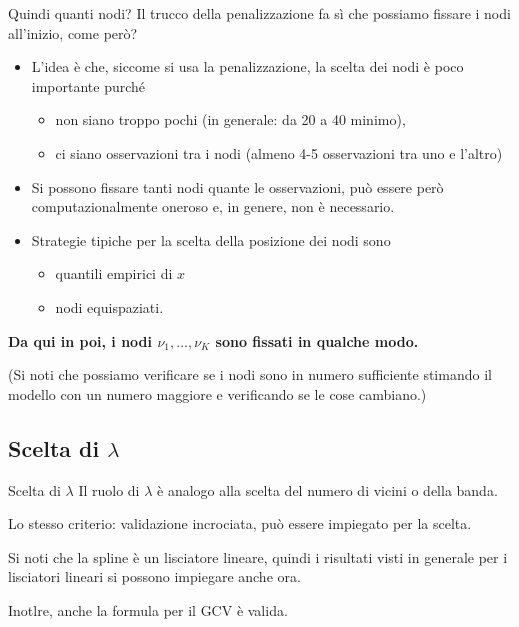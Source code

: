 \documentclass{beamer}\usepackage[]{graphicx}\usepackage[]{color}
\newcommand{\spazio}{\noindent\makebox[\linewidth]{\resizebox{0.1\linewidth}{1pt}{{$\bullet$}}}}
\begin{document}
\begin{frame}[fragile]{Quindi quanti nodi?}
Il trucco della penalizzazione fa s\`i che possiamo fissare i nodi all'inizio, come per\`o?
\begin{itemize}
\item L'idea \`e che, siccome si usa la penalizzazione, la scelta dei nodi \`e poco importante purch\'e
\begin{itemize}
\item non siano troppo pochi (in generale: da 20 a 40 minimo),
\item ci siano osservazioni tra i nodi (almeno 4-5 osservazioni tra uno e l'altro)
\end{itemize}
\item Si possono fissare tanti nodi quante le osservazioni, pu\`o essere per\`o computazionalmente oneroso e, in genere, non \`e necessario.
\item Strategie tipiche per la scelta della posizione dei nodi sono
\begin{itemize}
\item quantili empirici di $x$ 
\item nodi equispaziati.
\end{itemize}
\end{itemize}

\begin{center}
{\bf Da qui in poi, i nodi $\nu_1,\ldots, \nu_K$ sono fissati in qualche modo.}
\end{center}

(Si noti che possiamo verificare se i nodi sono in numero sufficiente stimando il modello con un numero maggiore e verificando se le cose cambiano.)
\end{frame}










\subsection{Scelta di $\lambda$}

\begin{frame}{Scelta di $\lambda$}
Il ruolo di $\lambda$ \`e analogo alla scelta del numero di vicini o della banda.

\spazio

Lo stesso criterio: validazione incrociata, pu\`o essere impiegato per la scelta.

\spazio

Si noti che la spline \`e un lisciatore lineare, quindi i risultati visti in generale per i lisciatori lineari si possono impiegare anche ora.

\spazio

Inotlre, anche la formula per il GCV \`e valida.
\end{frame}
\end{document}

